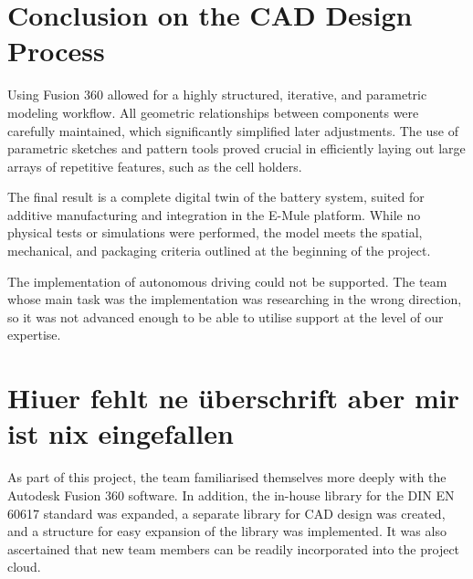 \section{Conclusion on the CAD Design Process}

Using Fusion 360 allowed for a highly structured, iterative, and parametric modeling workflow. All geometric relationships between components were carefully maintained, which significantly simplified later adjustments. The use of parametric sketches and pattern tools proved crucial in efficiently laying out large arrays of repetitive features, such as the cell holders.

The final result is a complete digital twin of the battery system, suited for additive manufacturing and integration in the E-Mule platform. While no physical tests or simulations were performed, the model meets the spatial, mechanical, and packaging criteria outlined at the beginning of the project.


The implementation of autonomous driving could not be supported. The team whose main task was the implementation was researching in the wrong direction, so it was not advanced enough to be able to utilise support at the level of our expertise.


\section{Hiuer fehlt ne überschrift aber mir ist nix eingefallen}
As part of this project, the team familiarised themselves more deeply with the Autodesk Fusion 360 software. In addition, the in-house library for the DIN EN 60617 standard was expanded, a separate library for CAD design was created, and a structure for easy expansion of the library was implemented. It was also ascertained that new team members can be readily incorporated into the project cloud.

